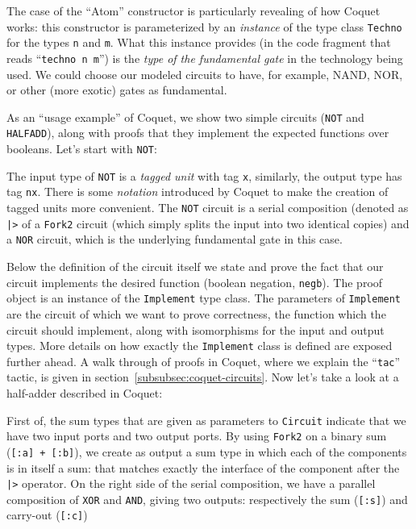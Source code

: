             The case of the ``Atom'' constructor is particularly revealing of how Coquet works: this
            constructor is parameterized by an \emph{instance} of the type class \texttt{Techno} for
            the types \texttt{n} and \texttt{m}. What this instance provides (in the code fragment
            that reads ``\texttt{techno n m}'') is the \emph{type of the fundamental gate} in the
            technology being used. We could choose our modeled circuits to have, for example, NAND,
            NOR, or other (more exotic) gates as fundamental.

            As an ``usage example'' of Coquet, we show two simple circuits (\texttt{NOT} and
            \texttt{HALFADD}), along with proofs that they implement the expected functions over
            booleans. Let's start with \texttt{NOT}:


            The input type of \texttt{NOT} is a \emph{tagged unit} with tag \texttt{x}, similarly,
            the output type has tag \texttt{nx}. There is some \emph{notation} introduced by Coquet
            to make the creation of tagged units more convenient. The \texttt{NOT} circuit is a
            serial composition (denoted as \texttt{|>} of a \texttt{Fork2} circuit (which simply
            splits the input into two identical copies) and a \texttt{NOR} circuit, which is the
            underlying fundamental gate in this case.

            Below the definition of the circuit itself we state and prove the fact that our circuit
            implements the desired function (boolean negation, \texttt{negb}). The proof object is
            an instance of the \texttt{Implement} type class. The parameters of \texttt{Implement}
            are the circuit of which we want to prove correctness, the function which the circuit
            should implement, along with isomorphisms for the input and output types. More details
            on how exactly the \texttt{Implement} class is defined are exposed further ahead. A walk
            through of proofs in Coquet, where we explain the ``\texttt{tac}'' tactic, is given in
            section~\ref{subsubsec:coquet-circuits}. Now let's take a look at a half-adder described
            in Coquet:


            First of, the sum types that are given as parameters to \texttt{Circuit} indicate that
            we have two input ports and two output ports. By using \texttt{Fork2} on a binary sum
            (\texttt{[:a] + [:b]}), we create as output a sum type in which each of the components
            is in itself a sum: that matches exactly the interface of the component after the
            \texttt{|>} operator. On the right side of the serial composition, we have a parallel
            composition of \texttt{XOR} and \texttt{AND}, giving two outputs: respectively the sum
            (\texttt{[:s]}) and carry-out (\texttt{[:c]}) 

